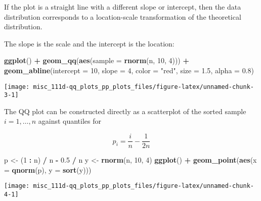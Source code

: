 \documentclass[]{book}
\newenvironment{Shaded}{\begin{snugshade}}{\end{snugshade}}
\newcommand{\DataTypeTok}[1]{\textcolor[rgb]{0.13,0.29,0.53}{#1}}
\newcommand{\DecValTok}[1]{\textcolor[rgb]{0.00,0.00,0.81}{#1}}
\newcommand{\FloatTok}[1]{\textcolor[rgb]{0.00,0.00,0.81}{#1}}
\newcommand{\KeywordTok}[1]{\textcolor[rgb]{0.13,0.29,0.53}{\textbf{#1}}}
\newcommand{\NormalTok}[1]{#1}
\newcommand{\OperatorTok}[1]{\textcolor[rgb]{0.81,0.36,0.00}{\textbf{#1}}}
\newcommand{\StringTok}[1]{\textcolor[rgb]{0.31,0.60,0.02}{#1}}
\begin{document}
If the plot is a straight line with a different slope or intercept, then the data distribution corresponds to a location-scale transformation of the theoretical distribution.

The slope is the scale and the intercept is the location:

\begin{Shaded}
\begin{Highlighting}[]
\KeywordTok{ggplot}\NormalTok{() }\OperatorTok{+}
\StringTok{    }\KeywordTok{geom_qq}\NormalTok{(}\KeywordTok{aes}\NormalTok{(}\DataTypeTok{sample =} \KeywordTok{rnorm}\NormalTok{(n, }\DecValTok{10}\NormalTok{, }\DecValTok{4}\NormalTok{))) }\OperatorTok{+}
\StringTok{    }\KeywordTok{geom_abline}\NormalTok{(}\DataTypeTok{intercept =} \DecValTok{10}\NormalTok{, }\DataTypeTok{slope =} \DecValTok{4}\NormalTok{,}
                \DataTypeTok{color =} \StringTok{"red"}\NormalTok{, }\DataTypeTok{size =} \FloatTok{1.5}\NormalTok{, }\DataTypeTok{alpha =} \FloatTok{0.8}\NormalTok{)}
\end{Highlighting}
\end{Shaded}

\begin{center}\texttt{[image: misc\_111d-qq\_plots\_pp\_plots\_files/figure-latex/unnamed-chunk-3-1]} \end{center}

The QQ plot can be constructed directly as a scatterplot of the sorted sample \(i = 1, \dots, n\) against quantiles for

\[p_i = \frac{i}{n} - \frac{1}{2n}\]

\begin{Shaded}
\begin{Highlighting}[]
\NormalTok{p <-}\StringTok{ }\NormalTok{(}\DecValTok{1} \OperatorTok{:}\StringTok{ }\NormalTok{n) }\OperatorTok{/}\StringTok{ }\NormalTok{n }\OperatorTok{-}\StringTok{ }\FloatTok{0.5} \OperatorTok{/}\StringTok{ }\NormalTok{n}
\NormalTok{y <-}\StringTok{ }\KeywordTok{rnorm}\NormalTok{(n, }\DecValTok{10}\NormalTok{, }\DecValTok{4}\NormalTok{)}
\KeywordTok{ggplot}\NormalTok{() }\OperatorTok{+}\StringTok{ }\KeywordTok{geom_point}\NormalTok{(}\KeywordTok{aes}\NormalTok{(}\DataTypeTok{x =} \KeywordTok{qnorm}\NormalTok{(p), }\DataTypeTok{y =} \KeywordTok{sort}\NormalTok{(y)))}
\end{Highlighting}
\end{Shaded}

\begin{center}\texttt{[image: misc\_111d-qq\_plots\_pp\_plots\_files/figure-latex/unnamed-chunk-4-1]} \end{center}
\end{document}
